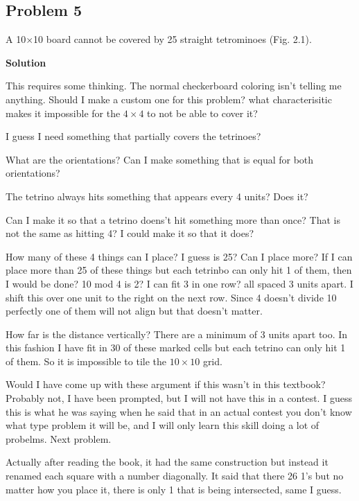 \documentclass{article}
\begin{document}
\subsection{Problem 5}

A 10$\times$10 board cannot be covered by 25 straight tetrominoes (Fig. 2.1).

\textbf{Solution}

This requires some thinking. The normal checkerboard coloring isn't telling me anything.
Should I make a custom one for this problem? what characterisitic makes it 
impossible for the $4\times4$ to not be able to cover it?

I guess I need something that partially covers the tetrinoes?

What are the orientations? Can I make something that is equal for both orientations?

The tetrino always hits something that appears every 4 units? Does it?

Can I make it so that a tetrino doens't hit something more than once? That is 
not the same as hitting 4? I could make it so that it does?

How many of these 4 things can I place? I guess is 25? Can I place more?
If I can place more than 25 of these things but each tetrinbo can only hit 1 of
them, then I would be done? 10 mod 4 is 2? I can fit 3 in one row? all spaced 3 units 
apart. I shift this over one unit to the right on the next row. Since 4 doesn't 
divide 10 perfectly one of them will not align but that doesn't matter. 

How far is the distance vertically? There are a minimum of 3 units apart too.
In this fashion I have fit in 30 of these marked cells but each tetrino can only 
hit 1 of them. So it is impossible to tile the $10\times 10$ grid.

Would I have come up with these argument if this wasn't in this textbook? Probably 
not, I have been prompted, but I will not have this in a contest. I guess this is what
he was saying when he said that in an actual contest you don't know what type problem it will 
be, and I will only learn this skill doing a lot of probelms. Next problem.

Actually after reading the book, it had the same construction but 
instead it renamed each square with a number diagonally. It 
said that there 26 1's but no matter how you place it, there is only 1 that is 
being intersected, same I guess.

\pagebreak
\end{document}
